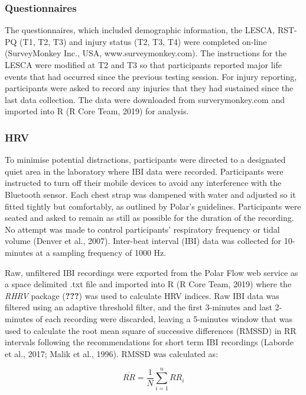 \documentclass[
]{frontiersHLTH}
\begin{document}
\hypertarget{questionnaires}{%
\subsubsection{Questionnaires}\label{questionnaires}}

The questionnaires, which included demographic information, the LESCA,
RST-PQ (T1, T2, T3) and injury status (T2, T3, T4) were completed
on-line (SurveyMonkey Inc., USA, www.surveymonkey.com). The instructions
for the LESCA were modified at T2 and T3 so that participants reported
major life events that had occurred since the previous testing session.
For injury reporting, participants were asked to record any injuries
that they had sustained since the last data collection. The data were
downloaded from surverymonkey.com and imported into R (R Core Team,
2019) for analysis.

\hypertarget{hrv}{%
\subsubsection{HRV}\label{hrv}}

To minimise potential distractions, participants were directed to a
designated quiet area in the laboratory where IBI data were recorded.
Participants were instructed to turn off their mobile devices to avoid
any interference with the Bluetooth sensor. Each chest strap was
dampened with water and adjusted so it fitted tightly but comfortably,
as outlined by Polar's guidelines. Participants were seated and asked to
remain as still as possible for the duration of the recording. No
attempt was made to control participants' respiratory frequency or tidal
volume (Denver et al., 2007). Inter-beat interval (IBI) data was
collected for 10-minutes at a sampling frequency of 1000 Hz.

Raw, unfiltered IBI recordings were exported from the Polar Flow web
service as a space delimited .txt file and imported into R (R Core Team,
2019) where the \emph{RHRV} package ({\textbf{???}}) was used to
calculate HRV indices. Raw IBI data was filtered using an adaptive
threshold filter, and the first 3-minutes and last 2-minutes of each
recording were discarded, leaving a 5-minutes window that was used to
calculate the root mean square of successive differences (RMSSD) in RR
intervals following the recommendations for short term IBI recordings
(Laborde et al., 2017; Malik et al., 1996). RMSSD was calculated as:

\begin{equation} 
  \overline{RR} = \frac{1}{N} \sum_{i=1}^{n} RR_i
\end{equation}
\end{document}
